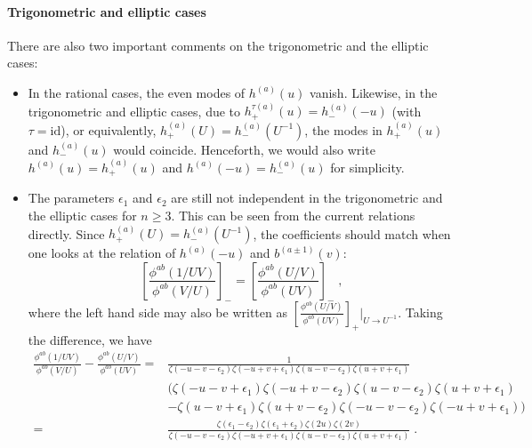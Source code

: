 \documentclass[11pt]{article}
\numberwithin{equation}{section}
\numberwithin{figure}{section}
\numberwithin{table}{section}
\begin{document}
\paragraph{Trigonometric and elliptic cases} There are also two important comments on the trigonometric and the elliptic cases:
\begin{itemize}
	\item In the rational cases, the even modes of $h^{(a)}(u)$ vanish. Likewise, in the trigonometric and elliptic cases, due to $h^{\tau(a)}_+(u)=h^{(a)}_-(-u)$ (with $\tau=\mathrm{id}$), or equivalently, $h^{(a)}_+(U)=h^{(a)}_-\left(U^{-1}\right)$, the modes in $h^{(a)}_+(u)$ and $h^{(a)}_-(u)$ would coincide. Henceforth, we would also write $h^{(a)}(u)=h^{(a)}_+(u)$ and $h^{(a)}(-u)=h^{(a)}_-(u)$ for simplicity.
	\item The parameters $\epsilon_1$ and $\epsilon_2$ are still not independent in the trigonometric and the elliptic cases for $n\geq3$. This can be seen from the current relations directly. Since $h^{(a)}_+(U)=h^{(a)}_-\left(U^{-1}\right)$, the coefficients should match when one looks at the relation of $h^{(a)}(-u)$ and $b^{(a\pm1)}(v)$:
	\begin{equation}
		\left[\frac{\phi^{ab}(1/UV)}{\phi^{ab}(V/U)}\right]_-=\left[\frac{\phi^{ab}(U/V)}{\phi^{ab}(UV)}\right]_-\;,
	\end{equation}
	where the left hand side may also be written as $\left[\frac{\phi^{ab}(U/V)}{\phi^{ab}(UV)}\right]_+\bigg|_{U\rightarrow U^{-1}}$. Taking the difference, we have
	\begin{align}
		\frac{\phi^{ab}(1/UV)}{\phi^{ab}(V/U)}-\frac{\phi^{ab}(U/V)}{\phi^{ab}(UV)}=&\frac{1}{\zeta(-u-v-\epsilon_2)\zeta(-u+v+\epsilon_1)\zeta(u-v-\epsilon_2)\zeta(u+v+\epsilon_1)}\nonumber\\
		&(\zeta(-u-v+\epsilon_1)\zeta(-u+v-\epsilon_2)\zeta(u-v-\epsilon_2)\zeta(u+v+\epsilon_1)\nonumber\\
		&-\zeta(u-v+\epsilon_1)\zeta(u+v-\epsilon_2)\zeta(-u-v-\epsilon_2)\zeta(-u+v+\epsilon_1))\nonumber\\
		=&\frac{\zeta(\epsilon_1-\epsilon_2)\zeta(\epsilon_1+\epsilon_2)\zeta(2u)\zeta(2v)}{\zeta(-u-v-\epsilon_2)\zeta(-u+v+\epsilon_1)\zeta(u-v-\epsilon_2)\zeta(u+v+\epsilon_1)}\;.
	\end{align}

\end{itemize}
\end{document}
